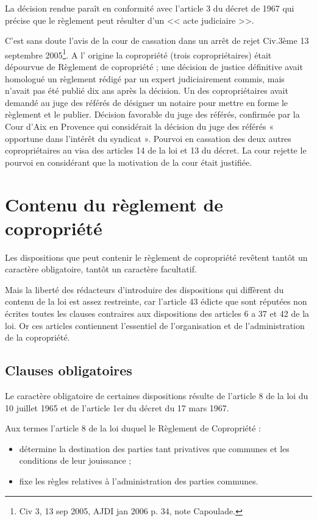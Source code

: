 			La décision rendue paraît en conformité avec l'article 3 du décret de 1967 qui précise que le règlement peut résulter d'un << acte judiciaire >>.
			
			C’est sans doute l’avis de la cour de cassation dans un arrêt de rejet Civ.3ème 13 septembre 2005\footnote{Civ 3\degres, 13 sep 2005, AJDI jan 2006 p. 34, note Capoulade.}. A l’ origine la copropriété (trois copropriétaires) était dépourvue de Règlement de copropriété ; une décision de justice définitive avait homologué un règlement rédigé par un expert judiciairement commis, mais n’avait pas été publié dix ans après la décision. Un des copropriétaires avait demandé au juge des référés de désigner un notaire pour mettre en forme le règlement et le publier. Décision favorable du juge des référés, confirmée par la Cour d’Aix en Provence qui considérait la décision du juge des référés « opportune dans l’intérêt du syndicat ». Pourvoi en cassation des deux autres copropriétaires au visa des articles 14 de la loi et 13 du décret. La cour rejette le pourvoi en considérant que la motivation de la cour était justifiée.
	
\section{Contenu du règlement de copropriété}
	
	Les dispositions que peut contenir le règlement de copropriété revêtent tantôt un caractère obligatoire, tantôt un caractère facultatif.
	
	Mais la liberté des rédacteurs d'introduire des dispositions qui diffèrent du contenu de la loi est assez restreinte, car l'article 43 édicte que sont réputées non écrites toutes les clauses contraires aux dispositions des articles 6 a 37 et 42 de la loi. Or ces articles contiennent l'essentiel de l'organisation et de l'administration de la copropriété.
	
	\subsection{Clauses obligatoires}
	
		Le caractère obligatoire de certaines dispositions résulte de l'article 8 de la loi du 10 juillet 1965 et de l'article 1er du décret du 17 mars 1967.
		
		Aux termes l'article 8 de la loi duquel le Règlement de Copropriété :
		\begin{itemize}
			\item détermine la destination des parties tant privatives que communes et les conditions de leur jouissance ;
			\item fixe les règles relatives à l'administration des parties communes.
		\end{itemize}
		
